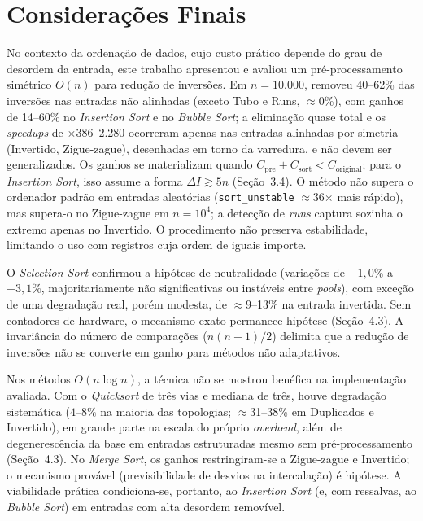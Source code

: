 \documentclass[portuguese]{sbc2025}%
\begin{document}
\section{Considerações Finais}

No contexto da ordenação de dados, cujo custo prático depende do grau de desordem da entrada, este trabalho apresentou e avaliou um pré-processamento simétrico $O(n)$ para redução de inversões. Em $n{=}10.000$, removeu 40--62\% das inversões nas entradas não alinhadas (exceto Tubo e Runs, $\approx$0\%), com ganhos de 14--60\% no \emph{Insertion Sort} e no \emph{Bubble Sort}; a eliminação quase total e os \emph{speedups} de $\times$386--2.280 ocorreram apenas nas entradas alinhadas por simetria (Invertido, Zigue-zague), desenhadas em torno da varredura, e não devem ser generalizados. Os ganhos se materializam quando $C_{\text{pre}} + C_{\text{sort}} < C_{\text{original}}$; para o \emph{Insertion Sort}, isso assume a forma $\Delta I \gtrsim 5n$ (Seção~3.4). O método não supera o ordenador padrão em entradas aleatórias (\texttt{sort\_unstable} $\approx$36$\times$ mais rápido), mas supera-o no Zigue-zague em $n{=}10^4$; a detecção de \emph{runs} captura sozinha o extremo apenas no Invertido. O procedimento não preserva estabilidade, limitando o uso com registros cuja ordem de iguais importe.

O \emph{Selection Sort} confirmou a hipótese de neutralidade (variações de $-1{,}0\%$ a $+3{,}1\%$, majoritariamente não significativas ou instáveis entre \emph{pools}), com exceção de uma degradação real, porém modesta, de $\approx$9--13\% na entrada invertida. Sem contadores de hardware, o mecanismo exato permanece hipótese (Seção~4.3). A invariância do número de comparações ($n(n-1)/2$) delimita que a redução de inversões não se converte em ganho para métodos não adaptativos.

Nos métodos $O(n \log n)$, a técnica não se mostrou benéfica na implementação avaliada. Com o \emph{Quicksort} de três vias e mediana de três, houve degradação sistemática ($4$--$8\%$ na maioria das topologias; $\approx$31--38\% em Duplicados e Invertido), em grande parte na escala do próprio \emph{overhead}, além de degenerescência da base em entradas estruturadas mesmo sem pré-processamento (Seção~4.3). No \emph{Merge Sort}, os ganhos restringiram-se a Zigue-zague e Invertido; o mecanismo provável (previsibilidade de desvios na intercalação) é hipótese. A viabilidade prática condiciona-se, portanto, ao \emph{Insertion Sort} (e, com ressalvas, ao \emph{Bubble Sort}) em entradas com alta desordem removível.
\end{document}
